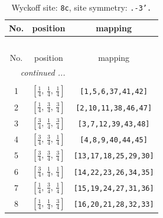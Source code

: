 \documentclass[fleqn,8pt]{jsarticle}
\begin{document}
\renewcommand{\arraystretch}{1.2}
\begin{longtable}{ccc}
\caption{Wyckoff site: {\tt 8c}, site symmetry: {\tt .-3'.}}
 \\
 \hline \hline
No. & position & mapping \\ \hline \endfirsthead

\multicolumn{2}{l}{\tablename\ \thetable{}} \\
 \hline \hline
No. & position & mapping \\ \hline \endhead

 \hline \hline
\multicolumn{2}{r}{\footnotesize\it continued ...} \\ \endfoot

 \hline \hline
\multicolumn{2}{r}{} \\ \endlastfoot

1 & $\left[ \frac{1}{4},\, \frac{1}{4},\, \frac{1}{4} \right]$ & {\tt [1,5,6,37,41,42]} \\ \hline
2 & $\left[ \frac{1}{4},\, \frac{3}{4},\, \frac{3}{4} \right]$ & {\tt [2,10,11,38,46,47]} \\ \hline
3 & $\left[ \frac{3}{4},\, \frac{1}{4},\, \frac{3}{4} \right]$ & {\tt [3,7,12,39,43,48]} \\ \hline
4 & $\left[ \frac{3}{4},\, \frac{3}{4},\, \frac{1}{4} \right]$ & {\tt [4,8,9,40,44,45]} \\ \hline
5 & $\left[ \frac{3}{4},\, \frac{3}{4},\, \frac{3}{4} \right]$ & {\tt [13,17,18,25,29,30]} \\ \hline
6 & $\left[ \frac{3}{4},\, \frac{1}{4},\, \frac{1}{4} \right]$ & {\tt [14,22,23,26,34,35]} \\ \hline
7 & $\left[ \frac{1}{4},\, \frac{3}{4},\, \frac{1}{4} \right]$ & {\tt [15,19,24,27,31,36]} \\ \hline
8 & $\left[ \frac{1}{4},\, \frac{1}{4},\, \frac{3}{4} \right]$ & {\tt [16,20,21,28,32,33]} \\
\end{longtable}
\renewcommand{\arraystretch}{1.2}
\end{document}

